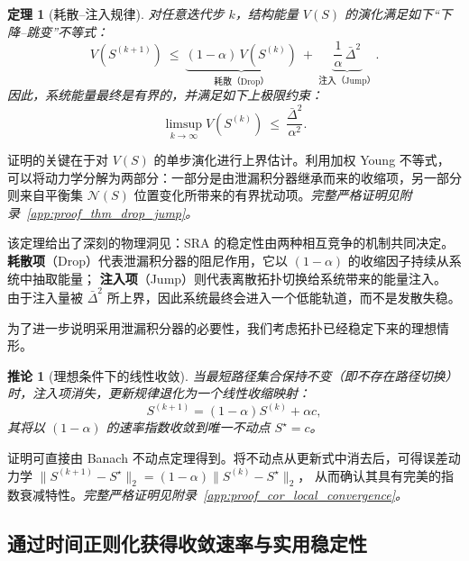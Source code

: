 \documentclass[journal]{IEEEtran}
\theoremstyle{plain}
\newtheorem{theorem}{定理}
\newtheorem{corollary}{推论}
\theoremstyle{definition}
\begin{document}
\begin{theorem}[耗散--注入规律]
\label{thm:drop_jump}
对任意迭代步 $k$，结构能量 $V(S)$ 的演化满足如下“下降--跳变”不等式：
\begin{equation}\label{eq:drop_jump_one_step}
V(S^{(k+1)})\ \le\ \underbrace{(1-\alpha)\,V(S^{(k)})}_{\text{耗散（Drop）}}\ +\ \underbrace{\dfrac{1}{\alpha}\,\bar\Delta^{2}}_{\text{注入（Jump）}}.
\end{equation}
因此，系统能量最终是有界的，并满足如下上极限约束：
\begin{equation}\label{eq:limsup_boundedness}
\limsup_{k\to\infty}V(S^{(k)})\ \le\ \frac{\bar\Delta^{2}}{\alpha^2}.
\end{equation}
\end{theorem}
\begin{IEEEproof}[证明思路]
证明的关键在于对 $V(S)$ 的单步演化进行上界估计。利用加权 Young 不等式，可以将动力学分解为两部分：一部分是由泄漏积分器继承而来的收缩项，另一部分则来自平衡集 $\mathcal N(S)$ 位置变化所带来的有界扰动项。\textit{完整严格证明见附录~\ref{app:proof_thm_drop_jump}。}
\end{IEEEproof}

该定理给出了深刻的物理洞见：SRA 的稳定性由两种相互竞争的机制共同决定。
\textbf{耗散项}（Drop）代表泄漏积分器的阻尼作用，它以 $(1-\alpha)$ 的收缩因子持续从系统中抽取能量；
\textbf{注入项}（Jump）则代表离散拓扑切换给系统带来的能量注入。
由于注入量被 $\bar{\Delta}^2$ 所上界，因此系统最终会进入一个低能轨道，而不是发散失稳。

为了进一步说明采用泄漏积分器的必要性，我们考虑拓扑已经稳定下来的理想情形。

\begin{corollary}[理想条件下的线性收敛]
\label{cor:local_convergence}
当最短路径集合保持不变（即不存在路径切换）时，注入项消失，更新规律退化为一个线性收缩映射：
\begin{equation}\label{eq:linear_update}
S^{(k+1)}=(1-\alpha)S^{(k)}+\alpha c,
\end{equation}
其将以 $(1-\alpha)$ 的速率指数收敛到唯一不动点 $S^\star=c$。
\end{corollary}
\begin{IEEEproof}[证明思路]
证明可直接由 Banach 不动点定理得到。将不动点从更新式中消去后，可得误差动力学
$\|S^{(k+1)}-S^\star\|_2 = (1-\alpha)\|S^{(k)}-S^\star\|_2$，
从而确认其具有完美的指数衰减特性。\textit{完整严格证明见附录~\ref{app:proof_cor_local_convergence}。}
\end{IEEEproof}

\subsection{通过时间正则化获得收敛速率与实用稳定性}
\label{subsec:practical_stability_rate}
\end{document}
